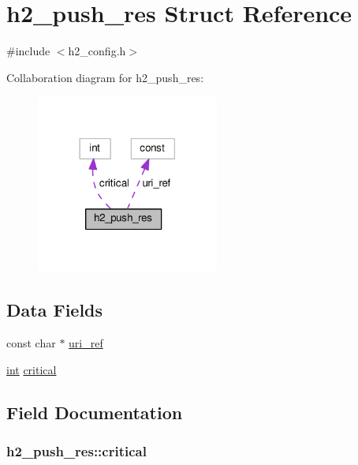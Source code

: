 \hypertarget{structh2__push__res}{}\section{h2\+\_\+push\+\_\+res Struct Reference}
\label{structh2__push__res}


{\ttfamily \#include $<$h2\+\_\+config.\+h$>$}



Collaboration diagram for h2\+\_\+push\+\_\+res\+:
\nopagebreak
\begin{figure}[H]
\begin{center}
\leavevmode
\includegraphics[width=170pt]{structh2__push__res__coll__graph}
\end{center}
\end{figure}
\subsection*{Data Fields}
\begin{DoxyCompactItemize}
\item 
const char $\ast$ \hyperlink{structh2__push__res_acc7a58a1a7fb8bbbb532694a6ce72a17}{uri\+\_\+ref}
\item 
\hyperlink{pcre_8txt_a42dfa4ff673c82d8efe7144098fbc198}{int} \hyperlink{structh2__push__res_a17cd833e5e66eca01733598bbd1f5830}{critical}
\end{DoxyCompactItemize}


\subsection{Field Documentation}
\subsubsection[{\texorpdfstring{critical}{critical}}]{ h2\+\_\+push\+\_\+res\+::critical}\hypertarget{structh2__push__res_a17cd833e5e66eca01733598bbd1f5830}{}\label{structh2__push__res_a17cd833e5e66eca01733598bbd1f5830}
